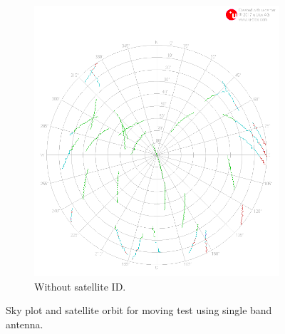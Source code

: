 \documentclass[letterpaper, 10 pt,onecolumn]{article}
\begin{document}
\begin{figure}[H]
\begin{subfigure}{.45\textwidth}
			\includegraphics[width=\linewidth]{../Moving_SingleBand/skyplot_orbit.png}
			\caption{	Without satellite ID.}
			\label{fig:mt1_obt}
		\end{subfigure}
		\caption[short]{Sky plot and satellite orbit for moving test using single band antenna.}
		\label{fig:mt1}
	\end{figure}
\end{document}
